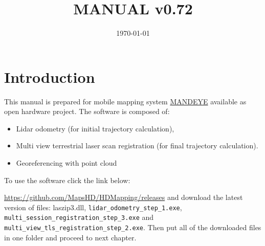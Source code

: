 \documentclass[a4paper,12pt]{book}
\begin{document}
\author{}
\title{MANUAL v0.72}
\date{\today}

\frontmatter
\maketitle
\tableofcontents

\mainmatter


\chapter{Introduction}
This manual is prepared for mobile mapping system \href{https://github.com/JanuszBedkowski/mandeye_controller/blob/main/doc/manual/manual_v0_2/mandeye_dev_manual_v0_2.pdf}{MANDEYE} available as open hardware project.
The software is composed of:
\begin{itemize}
	\item Lidar odometry (for initial trajectory calculation),
	\item Multi view terrestrial laser scan registration (for final trajectory calculation).
	\item Georeferencing with point cloud
\end{itemize}
To use the software click the link below:

\url{https://github.com/MapsHD/HDMapping/releases}
\linebreak
and download the latest version of files: laszip3.dll, \verb|lidar_odometry_step_1.exe|, \verb|multi_session_registration_step_3.exe|  and \verb|multi_view_tls_registration_step_2.exe|.
Then put all of the downloaded files in one folder and proceed to next chapter.















\backmatter
\end{document}
